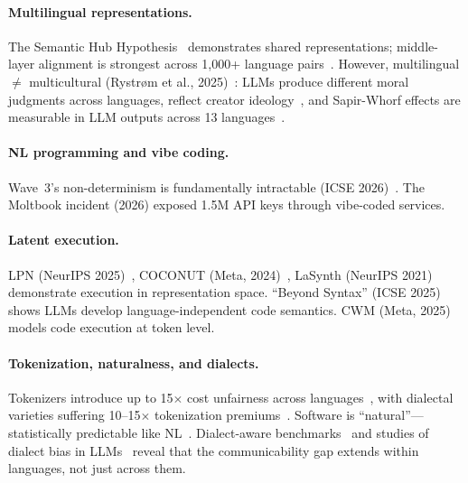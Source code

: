 \documentclass[11pt]{article}
\theoremstyle{definition}
\begin{document}
\paragraph{Multilingual representations.}
The Semantic Hub Hypothesis~\cite{wu2025semantichub} demonstrates shared representations; middle-layer alignment is strongest across 1,000+ language pairs~\cite{middlelayer2025}. However, multilingual $\neq$ multicultural (Rystr{\o}m et al., 2025)~\cite{rystrom2025multicultural}: LLMs produce different moral judgments across languages, reflect creator ideology~\cite{buyl2025ideology}, and Sapir-Whorf effects are measurable in LLM outputs across 13 languages~\cite{ray2025sapirwhorf}.

\paragraph{NL programming and vibe coding.}
Wave~3's non-determinism is fundamentally intractable (ICSE 2026)~\cite{icse2026reproducibility}. The Moltbook incident (2026) exposed 1.5M API keys through vibe-coded services.

\paragraph{Latent execution.}
LPN (NeurIPS 2025)~\cite{macfarlane2025lpn}, COCONUT (Meta, 2024)~\cite{hao2024coconut}, LaSynth (NeurIPS 2021)~\cite{chen2021lasynth} demonstrate execution in representation space. ``Beyond Syntax'' (ICSE 2025)~\cite{beyondsyntax2025} shows LLMs develop language-independent code semantics. CWM (Meta, 2025)~\cite{metafair2025cwm} models code execution at token level.

\paragraph{Tokenization, naturalness, and dialects.}
Tokenizers introduce up to 15$\times$ cost unfairness across languages~\cite{petrov2024tokenizers}, with dialectal varieties suffering 10--15$\times$ tokenization premiums~\cite{tokenbiases2025}. Software is ``natural''---statistically predictable like NL~\cite{hindle2012naturalness}. Dialect-aware benchmarks~\cite{faisal2025swan} and studies of dialect bias in LLMs~\cite{bui2025dialect} reveal that the communicability gap extends within languages, not just across them.
\end{document}
